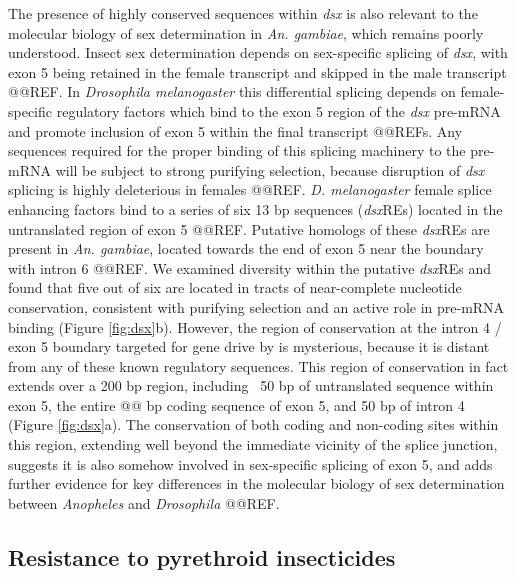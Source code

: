\documentclass[a4paper,11pt,abstracton,hidelinks]{scrartcl}
\begin{document}
The presence of highly conserved sequences within \textit{dsx} is also relevant to the molecular biology of sex determination in \textit{An. gambiae}, which remains poorly understood.
%
Insect sex determination depends on sex-specific splicing of \textit{dsx}, with exon 5 being retained in the female transcript and skipped in the male transcript @@REF.
%
In \textit{Drosophila melanogaster} this differential splicing depends on female-specific regulatory factors which bind to the exon 5 region of the \textit{dsx} pre-mRNA and promote inclusion of exon 5 within the final transcript @@REFs.
%
Any sequences required for the proper binding of this splicing machinery to the pre-mRNA will be subject to strong purifying selection, because disruption of \textit{dsx} splicing is highly deleterious in females @@REF. 
%
\textit{D. melanogaster} female splice enhancing factors bind to a series of six 13 bp sequences (\textit{dsx}REs) located in the untranslated region of exon 5 @@REF.
%
Putative homologs of these \textit{dsx}REs are present in \textit{An. gambiae},  located towards the end of exon 5 near the boundary with intron 6 @@REF.
%
We examined diversity within the putative \textit{dsx}REs and found that five out of six are located in tracts of near-complete nucleotide conservation, consistent with purifying selection and an active role in pre-mRNA binding (Figure \ref{fig:dsx}b).
%
However, the region of conservation at the intron 4 / exon 5 boundary targeted for gene drive by \cite{kyrou2018} is mysterious, because it is distant from any of these known regulatory sequences.
%
This region of conservation in fact extends over a 200 bp region, including ~50 bp of untranslated sequence within exon 5, the entire @@ bp coding sequence of exon 5, and 50 bp of intron 4 (Figure \ref{fig:dsx}a).
%
The conservation of both coding and non-coding sites within this region, extending well beyond the immediate vicinity of the splice junction, suggests it is also somehow involved in sex-specific splicing of exon 5, and adds further evidence for key differences in the molecular biology of sex determination between \textit{Anopheles} and \textit{Drosophila} @@REF. 
%


\subsection*{Resistance to pyrethroid insecticides}
\end{document}

